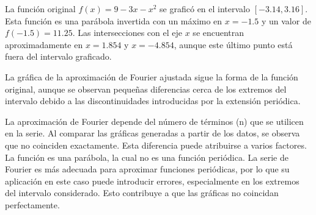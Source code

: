 {La función original \( f(x) = 9 - 3x - x^2 \) se graficó en el intervalo \([-3.14, 3.16]\). Esta función es una parábola invertida con un máximo en \( x = -1.5 \) y un valor de \( f(-1.5) = 11.25 \). Las intersecciones con el eje \( x \) se encuentran aproximadamente en \( x = 1.854 \) y \( x = -4.854 \), aunque este último punto está fuera del intervalo graficado.
\vspace{10pt}

La gráfica de la aproximación de Fourier ajustada sigue la forma de la función original, aunque se observan pequeñas diferencias cerca de los extremos del intervalo debido a las discontinuidades introducidas por la extensión periódica.

\vspace{10pt}
La aproximación de Fourier depende del número de términos (n) que se utilicen en la serie. Al comparar las gráficas generadas a partir de los datos, se observa que no coinciden exactamente. Esta diferencia puede atribuirse a varios factores. La función es una parábola, la cual no es una función periódica. La serie de Fourier es más adecuada para aproximar funciones periódicas, por lo que su aplicación en este caso puede introducir errores, especialmente en los extremos del intervalo considerado. Esto contribuye a que las gráficas no coincidan perfectamente.





}
